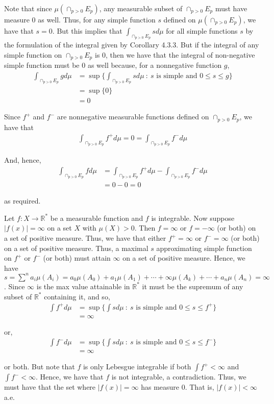\documentclass[12pt]{article}
\newenvironment{problem}[2][Problem]{\begin{trivlist}
\item[\hskip \labelsep {\bfseries #1}\hskip \labelsep {\bfseries #2.}]}{\end{trivlist}}
\begin{document}
Note that since $\mu \left(\cap_{p>0} E_p\right)$, any measurable subset of $\cap_{p>0} E_p$ must have measure $0$ as well. Thus, for any simple function $s$ defined on $\mu \left(\cap_{p>0} E_p\right)$, we have that $s = 0$. But this implies that $\int_{\cap_{p > 0} E_p} s d\mu$ for all simple functions $s$ by the formulation of the integral given by Corollary 4.3.3. But if the integral of any simple function on $\cap_{p>0} E_p$ is $0$, then we have that the integral of non-negative simple function must be $0$ as well because, for a nonnegative function $g$,
\begin{align*}
\int_{\cap_{p > 0} E_p} g d\mu &= \sup \{\int_{\cap_{p > 0} E_p} s d\mu \ : \ s \text{ is simple and } 0 \leq s \leq g\}\\
&= \sup \{0\}\\
&= 0
\end{align*}

Since $f^+$ and $f^-$ are nonnegative measurable functions defined on $\cap_{p>0} E_p$, we have that
\begin{align*}
\int_{\cap_{p > 0} E_p} f^+ d\mu = 0 = \int_{\cap_{p > 0} E_p} f^- d\mu
\end{align*}

And, hence,
\begin{align*}
\int_{\cap_{p > 0} E_p} f d\mu &= \int_{\cap_{p > 0} E_p} f^+ d\mu - \int_{\cap_{p > 0} E_p} f^- d\mu\\
&= 0 - 0 = 0
\end{align*}

as required.

\begin{problem}{9}
\end{problem}

Let $f: X \to \mathbb{R}^*$ be a measurable function and $f$ is integrable. Now suppose $|f(x)| = \infty$ on a set $X$ with $\mu(X) > 0$. Then $f = \infty$ or $f = -\infty$ (or both) on a set of positive measure. Thus, we have that either $f^+ = \infty$ or $f^- = \infty$ (or both) on a set of positive measure. Thus, a maximal $s$ approximating simple function on $f^+$ or $f^-$ (or both) must attain $\infty$ on a set of positive measure. Hence, we have $s = \sum^n a_i \mu(A_i) = a_0 \mu(A_0) + a_1 \mu(A_1) + \cdots + \infty \mu(A_k) + \cdots + a_n \mu(A_n) = \infty$. Since $\infty$ is the max value attainable in $\mathbb{R}^*$ it must be the supremum of any subset of $\mathbb{R}^*$ containing it, and so,
\begin{align*}
\int f^+ d\mu &= \sup \{ \int s d\mu \ : \ s \text{ is simple and } 0 \leq s \leq f^+\}\\
&= \infty
\end{align*}

or,
\begin{align*}
\int f^- d\mu &= \sup \{ \int s d\mu \ : \ s \text{ is simple and } 0 \leq s \leq f^-\}\\
&= \infty
\end{align*}

or both. But note that $f$ is only Lebesgue integrable if both $\int f^+ < \infty$ and $\int f^- < \infty$. Hence, we have that $f$ is not integrable, a contradiction. Thus, we must have that the set where $|f(x)| = \infty$ has measure $0$. That is, $|f(x)| < \infty$ a.e.
\end{document}
